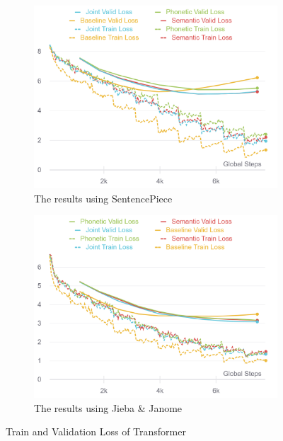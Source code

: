 \vspace{0.5cm}
\begin{figure}[t]
    \centering
    \begin{subfigure}[b]{0.495\textwidth}
        \centering
        \includegraphics[width=\textwidth]{../images/transformer_sp.png}
        \caption{The results using SentencePiece}
        \label{fig:transformer_loss_sp}
    \end{subfigure}
    \hfill
    \begin{subfigure}[b]{0.495\textwidth}
        \centering
        \includegraphics[width=\textwidth]{../images/transformer_jj.png}
        \caption{The results using Jieba \& Janome}
        \label{fig:transformer_loss_jj}
    \end{subfigure}
    \caption{Train and Validation Loss of Transformer}
	\label{fig:transformer_loss}
\end{figure}

